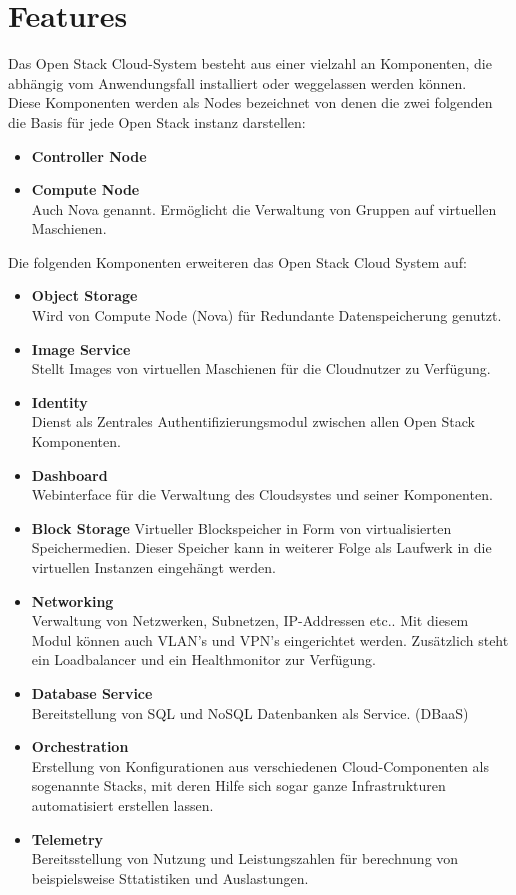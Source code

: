 \documentclass[a4paper,nochapterprefix,english,12pt]{scrreprt}
\begin{document}
\section{Features}
Das Open Stack Cloud-System besteht aus einer vielzahl an Komponenten, die abhängig vom Anwendungsfall installiert oder weggelassen werden können.\\
Diese Komponenten werden als Nodes bezeichnet von denen die zwei folgenden die Basis für jede Open Stack instanz darstellen:
\begin{itemize}
	\item \textbf{Controller Node}
	\item \textbf{Compute Node}\\
		  Auch Nova genannt. Ermöglicht die Verwaltung von Gruppen auf virtuellen Maschienen.\\
\end{itemize}
Die folgenden Komponenten erweiteren das Open Stack Cloud System auf:
\begin{itemize}
	\item \textbf{Object Storage}\\
		Wird von Compute Node (Nova) für Redundante Datenspeicherung genutzt.
	\item \textbf{Image Service}\\
		Stellt Images von virtuellen Maschienen für die Cloudnutzer zu Verfügung.
	\item \textbf{Identity}\\
		Dienst als Zentrales Authentifizierungsmodul zwischen allen Open Stack Komponenten.
	\item \textbf{Dashboard}\\
		Webinterface für die Verwaltung des Cloudsystes und seiner Komponenten.
	\item \textbf{Block Storage}
		Virtueller Blockspeicher in Form von virtualisierten Speichermedien. Dieser Speicher kann in weiterer Folge als Laufwerk in die virtuellen Instanzen eingehängt werden.
	\item \textbf{Networking}\\
		Verwaltung von Netzwerken, Subnetzen, IP-Addressen etc.. Mit diesem Modul können auch VLAN's und VPN's eingerichtet werden. Zusätzlich steht ein Loadbalancer und ein Healthmonitor zur Verfügung.
	\item \textbf{Database Service}\\
		Bereitstellung von SQL und NoSQL Datenbanken als Service. (DBaaS)
	\item \textbf{Orchestration}\\
		Erstellung von Konfigurationen aus verschiedenen Cloud-Componenten als sogenannte Stacks, mit deren Hilfe sich sogar ganze Infrastrukturen automatisiert erstellen lassen.
	\item \textbf{Telemetry}\\
		Bereitsstellung von Nutzung und Leistungszahlen für berechnung von beispielsweise Sttatistiken und Auslastungen. \citep{OS-WikiEntry} \cite{OS-NodeTrainingGuide} \citep{OS-WikiEntry}
		
\end{itemize}
\end{document}
